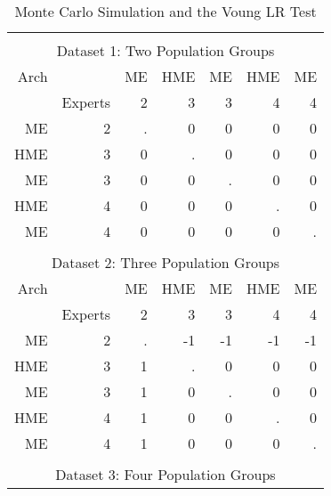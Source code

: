 \documentclass[12pt]{article}
\theoremstyle{definition}
\begin{document}
\begin{table}[t!] \centering
  \caption{Monte Carlo Simulation and the Voung LR Test}
  \begin{threeparttable}
    \begin{tabular}[l]{r r r r r r r}
              &         &       &       &       &       &          \\
      \multicolumn{7}{c}{Dataset 1: Two Population Groups}                    \\
      \hline
      Arch    &         & ME    & HME   & ME    & HME   & ME       \\
              & Experts & 2     & 3     & 3     & 4     & 4        \\
              \hline
      ME      & 2       & .     & 0     & 0     & 0     & 0        \\
      HME     & 3       & 0     & .     & 0     & 0     & 0        \\
      ME      & 3       & 0     & 0     & .     & 0     & 0        \\
      HME     & 4       & 0     & 0     & 0     & .     & 0        \\
      ME      & 4       & 0     & 0     & 0     & 0     & .        \\
      \hline
              &         &       &       &       &       &          \\
      \multicolumn{7}{c}{Dataset 2: Three Population Groups}                  \\
      \hline
      Arch    &         & ME    & HME   & ME    & HME   & ME       \\
              & Experts & 2     & 3     & 3     & 4     & 4        \\
              \hline
      ME      & 2       & .     & -1    & -1    & -1    & -1       \\
      HME     & 3       & 1     & .     & 0     & 0     & 0        \\
      ME      & 3       & 1     & 0     & .     & 0     & 0        \\
      HME     & 4       & 1     & 0     & 0     & .     & 0        \\
      ME      & 4       & 1     & 0     & 0     & 0     & .        \\
      \hline
              &         &       &       &       &       &          \\
      \multicolumn{7}{c}{Dataset 3: Four Population Groups}                   \\
      \hline

\end{tabular}
\end{threeparttable}
\end{table}
\end{document}
